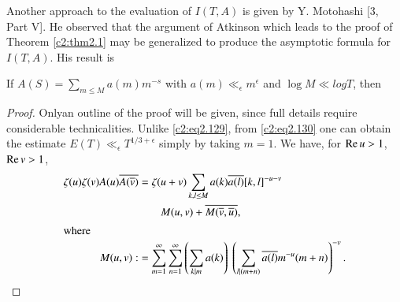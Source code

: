 Another approach to the evaluation of $I (T, A)$ is given by
Y. Motohashi [3, Part V]. He observed that the argument of Atkinson
which leads to the proof of Theorem \ref{c2:thm2.1} may be generalized
to produce the asymptotic formula for $I (T, A)$. His result is 

\begin{thm}\label{c2:thm2.12}
  If $A(S) = \displaystyle{\sum_{m \leq M}} a (m) m^{-s}$ with $a(m)
  \ll_\epsilon m^\epsilon$ and $\log M \ll log T$, then 
  {}
\end{thm}

\begin{proof}
  Only\pageoriginale an outline of the proof will be given, since full
  details require considerable technicalities. Unlike
  \eqref{c2:eq2.129}, from \eqref{c2:eq2.130} one can obtain the
  estimate $E(T)\ll_\epsilon T^{1/3+ \epsilon}$ simply by taking
  $m=1$. We have, for $\operatorname{Re} u >1$, $\operatorname{Re} v > 1$,
  \begin{align*}
    \zeta (u) \zeta (v) A (u) \overline{A (\overline{v})} & = \zeta (u+v) \sum_{k,
    l \leq M} a (k) \overline{a(l)} [k, l]^{-u-v}\\
    & \qquad M (u, v)+ \overline{M(\overline{v}, \overline{u})},\\
    \intertext{where}
    M (u, v) : &= \sum^\infty_{m=1} \sum^\infty_{n=1} \left(\sum_{k
      \mid m} a(k) \right)~ \left( \sum_{l \mid (m+n)} \overline{a(l)}
    m^{-u} (m+n)\right)^{-v}.
  \end{align*}
\end{proof}

